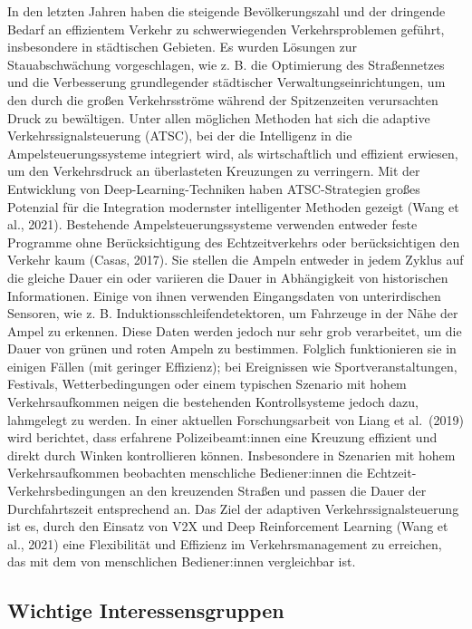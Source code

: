 \documentclass[
]{book}
\begin{document}
In den letzten Jahren haben die steigende Bevölkerungszahl und der dringende Bedarf an effizientem Verkehr zu schwerwiegenden Verkehrsproblemen geführt, insbesondere in städtischen Gebieten. Es wurden Lösungen zur Stauabschwächung vorgeschlagen, wie z. B. die Optimierung des Straßennetzes und die Verbesserung grundlegender städtischer Verwaltungseinrichtungen, um den durch die großen Verkehrsströme während der Spitzenzeiten verursachten Druck zu bewältigen. Unter allen möglichen Methoden hat sich die adaptive Verkehrssignalsteuerung (ATSC), bei der die Intelligenz in die Ampelsteuerungssysteme integriert wird, als wirtschaftlich und effizient erwiesen, um den Verkehrsdruck an überlasteten Kreuzungen zu verringern. Mit der Entwicklung von Deep-Learning-Techniken haben ATSC-Strategien großes Potenzial für die Integration modernster intelligenter Methoden gezeigt (Wang et al., 2021).
Bestehende Ampelsteuerungssysteme verwenden entweder feste Programme ohne Berücksichtigung des Echtzeitverkehrs oder berücksichtigen den Verkehr kaum (Casas, 2017). Sie stellen die Ampeln entweder in jedem Zyklus auf die gleiche Dauer ein oder variieren die Dauer in Abhängigkeit von historischen Informationen. Einige von ihnen verwenden Eingangsdaten von unterirdischen Sensoren, wie z. B. Induktionsschleifendetektoren, um Fahrzeuge in der Nähe der Ampel zu erkennen. Diese Daten werden jedoch nur sehr grob verarbeitet, um die Dauer von grünen und roten Ampeln zu bestimmen. Folglich funktionieren sie in einigen Fällen (mit geringer Effizienz); bei Ereignissen wie Sportveranstaltungen, Festivals, Wetterbedingungen oder einem typischen Szenario mit hohem Verkehrsaufkommen neigen die bestehenden Kontrollsysteme jedoch dazu, lahmgelegt zu werden.
In einer aktuellen Forschungsarbeit von Liang et al.~(2019) wird berichtet, dass erfahrene Polizeibeamt:innen eine Kreuzung effizient und direkt durch Winken kontrollieren können. Insbesondere in Szenarien mit hohem Verkehrsaufkommen beobachten menschliche Bediener:innen die Echtzeit-Verkehrsbedingungen an den kreuzenden Straßen und passen die Dauer der Durchfahrtszeit entsprechend an. Das Ziel der adaptiven Verkehrssignalsteuerung ist es, durch den Einsatz von V2X und Deep Reinforcement Learning (Wang et al., 2021) eine Flexibilität und Effizienz im Verkehrsmanagement zu erreichen, das mit dem von menschlichen Bediener:innen vergleichbar ist.

\hypertarget{wichtige-interessensgruppen-15}{%
\subsection*{Wichtige Interessensgruppen}\label{wichtige-interessensgruppen-15}}
\end{document}
